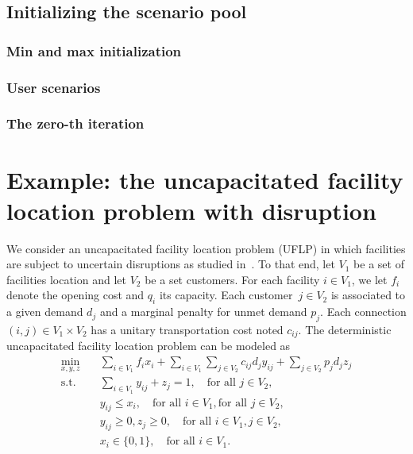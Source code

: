 \subsection{Initializing the scenario pool}
\label{sec:ccg:initial-scenario}

\subsubsection{Min and max initialization}


\subsubsection{User scenarios}


\subsubsection{The zero-th iteration}


\section[Example: the UFLP with disruption]{Example: the uncapacitated facility location problem with disruption}

We consider an uncapacitated facility location problem (UFLP) in which
facilities are subject to uncertain disruptions as studied
in~\textcite{Cheng2021}. To that end, let $V_1$ be a set of facilities
location and let $V_2$ be a set customers. For each facility $i\in V_1$, we
let $f_i$ denote the opening cost and $q_i$ its capacity. Each customer~$j\in
V_2$ is associated to a given demand $d_j$ and a marginal penalty for unmet
demand $p_j$. Each connection $(i,j)\in V_1\times V_2$ has a unitary
transportation cost noted $c_{ij}$. The deterministic uncapacitated facility
location problem can be modeled as 
%
\begin{subequations}
    \label{eq:ccg:uflp}
    \begin{align}
        \min_{x,y,z} \quad & \sum_{i\in V_1} f_ix_i + \sum_{i\in V_1} \sum_{j\in V_2} c_{ij} d_j y_{ij} + \sum_{j\in V_2} p_jd_jz_j \\
        \text{s.t.} \quad & \sum_{i\in V_1} y_{ij} + z_j = 1, \quad \text{for all } j\in V_2, \label{eq:ccg:uflp:assignment} \\
        & y_{ij} \le x_i, \quad \text{for all } i\in V_1, \text{for all } j\in V_2,  \label{eq:ccg:uflp:activation} \\
        & y_{ij}\ge 0, z_j \ge 0, \quad \text{for all } i\in V_1, j\in V_2, \label{eq:ccg:uflp:non-negative} \\
        & x_i\in\{0,1\}, \quad \text{for all } i\in V_1.
    \end{align}
\end{subequations}

